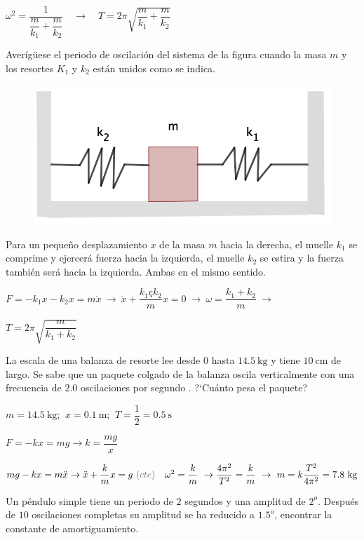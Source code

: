 $\omega^2 = \dfrac {1}{\dfrac {m}{k_1} + \dfrac{m}{k_2}} \quad \to \quad T=2\pi \sqrt{\dfrac{m}{k_1}+\dfrac{m}{k_2}}$ 

\vspace{5mm}%
\begin{prob}
\begin{multicols}{2}
Averígüese el periodo de oscilación del sistema de la figura cuando la masa $m$ y los resortes $K_1$ y $k_2$ están unidos como se indica.
\begin{figure}[H]
		\centering
		\includegraphics[width=.5\textwidth]{imagenes/imagenes21/T21IM13.png}
	\end{figure}	
\end{multicols}
\end{prob}

Para un pequeño desplazamiento $x$ de la masa $m$ hacia la derecha, el muelle $k_1$ se comprime y ejercerá fuerza hacia la izquierda, el muelle $k_2$ se estira y la fuerza también será hacia la izquierda. Ambas en el mismo sentido.

$F=-k_1x-k_2x=m\ddot{x} \ \to \ \ddot{x}+\dfrac{k_1çk_2}{m}x=0 \ \to \ \omega=\dfrac{k_1+k_2}{m} \ \to $

$ T=2\pi \sqrt{\dfrac{m}{k_1+k_2}}$

\begin{prob}
La escala de una balanza de resorte lee desde $0$ hasta $14.5\ \mathrm{kg}$ y tiene $10\ \mathrm{cm}$ de largo. Se sabe que un paquete colgado de la balanza oscila verticalmente con una frecuencia de $2.0$ oscilaciones por segundo	. ?`Cuánto pesa el paquete?
\end{prob}

$m=14.5\ \mathrm{kg}$; $\ x=0.1\ \mathrm{m}$; $\ T=\dfrac 1 2= 0.5 \ \mathrm{s}$

$F=-kx=mg \to k=\dfrac{mg}{x}$

$mg-kx=m\ddot{x} \to \ddot{x}+\dfrac{k}{m}x=g\ \textcolor{gris}{(cte)} \quad \omega^2=\dfrac k m \ \to \dfrac{4\pi^2}{T^2}=\dfrac k m \ \to \ m=k\dfrac{T^2}{4\pi^2} = 7.8\ \mathrm{kg}$

\begin{prob}
Un péndulo	simple tiene un periodo de $2$ segundos y una amplitud de $2^o$. Después de $10$ oscilaciones completas su amplitud se ha reducido a $1.5^o$, encontrar la constante de amortiguamiento.
\end{prob}

